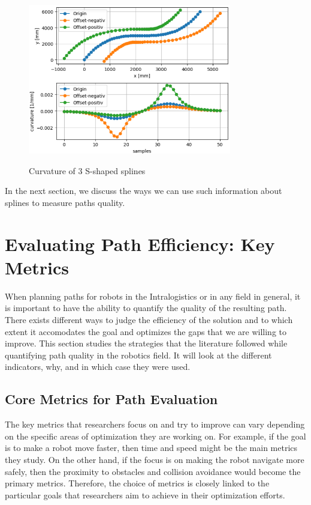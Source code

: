\begin{figure}[H]
    \begin{center}
        \includegraphics[width=3.5in]{images/Chap1/curvature.png}\\
        \caption{Curvature of 3 S-shaped splines}
        \label{curvature}
    \end{center}
\end{figure}
In the next section, we discuss the ways we can use such information about splines to measure paths quality.

\section{Evaluating Path Efficiency: Key Metrics}

When planning paths for robots in the Intralogistics or in any field in general, it is important to have the ability 
to quantify the quality of the resulting path. There exists different ways to judge the efficiency of the solution
and to which extent it accomodates the goal and optimizes the gaps that we are willing to improve.
This section studies the strategies that the literature followed while quantifying path quality in the robotics
field. It will look at the different indicators, why, and in which case they were used. 

\subsection{Core Metrics for Path Evaluation}
The key metrics that researchers focus on and try to improve can vary depending on the specific areas of 
optimization they are working on. For example, if the goal is to make a robot move faster, then time 
and speed might be the main metrics they study. On the other hand, if the focus is on making the robot 
navigate more safely, then the proximity to obstacles and collision avoidance would become the primary 
metrics. Therefore, the choice of metrics is closely linked to the particular goals that researchers 
aim to achieve in their optimization efforts.

